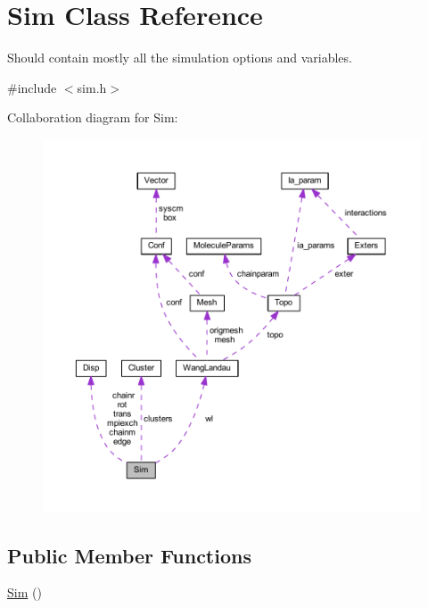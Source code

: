 \hypertarget{class_sim}{\section{Sim Class Reference}
\label{class_sim}
}


Should contain mostly all the simulation options and variables.  




{\ttfamily \#include $<$sim.\+h$>$}



Collaboration diagram for Sim\+:\nopagebreak
\begin{figure}[H]
\begin{center}
\leavevmode
\includegraphics[width=350pt]{class_sim__coll__graph}
\end{center}
\end{figure}
\subsection*{Public Member Functions}
\begin{DoxyCompactItemize}
\item 
\hyperlink{class_sim_ab8d2fcb600a965c06faff76f7aaf093a}{Sim} ()
\end{DoxyCompactItemize}
